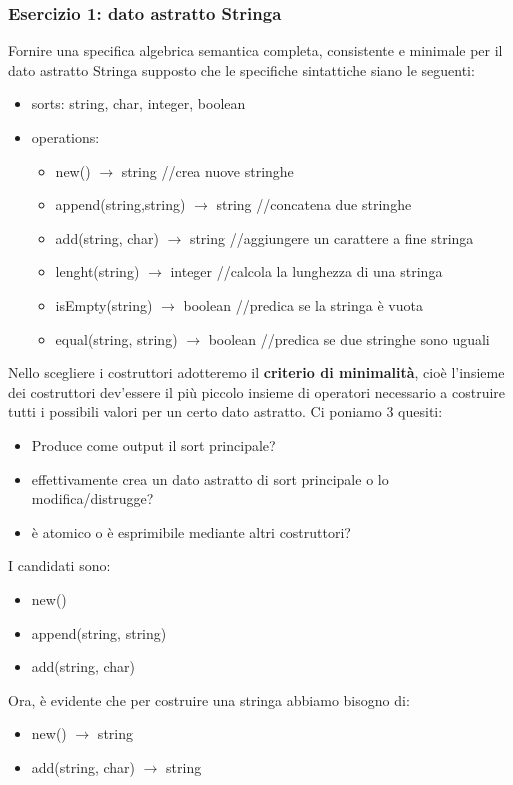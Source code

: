 \documentclass{article}
\begin{document}
	\subsubsection*{Esercizio 1: dato astratto Stringa}
	Fornire una specifica algebrica semantica completa, consistente e minimale per il dato astratto Stringa supposto che le specifiche sintattiche siano le seguenti:
	\begin{itemize}
		\item sorts: string, char, integer, boolean
		\item operations:
		\begin{itemize}
			\item new() $\rightarrow$ string //crea nuove stringhe
			\item append(string,string) $\rightarrow$ string //concatena due stringhe
			\item add(string, char) $\rightarrow$ string //aggiungere un carattere a fine stringa
			\item lenght(string) $\rightarrow$ integer //calcola la lunghezza di una stringa
			\item isEmpty(string) $\rightarrow$ boolean //predica se la stringa è vuota
			\item equal(string, string) $\rightarrow$ boolean //predica se due stringhe sono uguali
		\end{itemize}
	\end{itemize}
	Nello scegliere i costruttori adotteremo il \textbf{criterio di minimalità}, cioè l'insieme dei costruttori dev'essere il più piccolo insieme di operatori necessario a costruire tutti i possibili valori per un certo dato astratto.
	Ci poniamo 3 quesiti:
	\begin{itemize}
		\item Produce come output il sort principale?
		\item effettivamente crea un dato astratto di sort principale o lo modifica/distrugge?
		\item è atomico o è esprimibile mediante altri costruttori?
	\end{itemize}
	I candidati sono:
	\begin{itemize}
		\item new()
		\item append(string, string)
		\item add(string, char)
	\end{itemize}
	Ora, è evidente che per costruire una stringa abbiamo bisogno di:
	\begin{itemize}
		\item new() $\rightarrow$ string
		\item add(string, char) $\rightarrow$ string
	\end{itemize}
\end{document}

